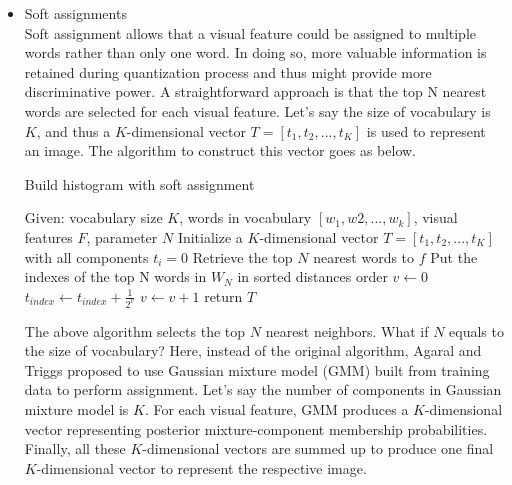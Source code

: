 	\begin{itemize}
		\item{Soft assignments}\\
		Soft assignment allows that a visual feature could be assigned to multiple words rather than only one word. In doing so, more valuable information is retained during quantization process and thus might provide more discriminative power. A straightforward approach \cite{jiang2007towards} is that the top N nearest words are selected for each visual feature. Let's say the size of vocabulary is $K$, and thus a $K$-dimensional vector $T = [t_1, t_2,..., t_K]$  is used to represent an image. The algorithm to construct this vector goes as below.\\

		  \begin{algorithm}
		  \caption{Build histogram with soft assignment}
		  \begin{algorithmic}[1]
		  \State Given: vocabulary size $K$, words in vocabulary $[w_1, w2,..., w_k]$, visual features $F$, parameter $N$
		  \State Initialize a $K$-dimensional vector $T = [t_1, t_2,..., t_K]$ with all components $t_i = 0$ 
		  \State
		  \State Retrieve the top $N$ nearest words to $f$
		  \State Put the indexes of the top N words in $W_N$ in sorted distances order
			  \State $v \gets 0$
			  	\State $t_{index} \gets t_{index} + \frac{1}{2^v}$
			  	\State $v \gets v + 1$
			  \EndFor
		  \EndFor
		  \State
		  \State return $T$
		  \end{algorithmic}
		  \end{algorithm}

		 The above algorithm selects the top $N$ nearest neighbors. What if $N$ equals to the size of vocabulary? Here, instead of the original algorithm, Agaral and Triggs \cite{agarwal2006hyperfeatures} proposed to use Gaussian mixture model (GMM) built from training data to perform assignment. Let's say the number of components in Gaussian mixture model is $K$. For each visual feature, GMM produces a $K$-dimensional vector representing posterior mixture-component membership probabilities. Finally, all these $K$-dimensional vectors are summed up to produce one final $K$-dimensional vector to represent the respective image. 


\end{itemize}
